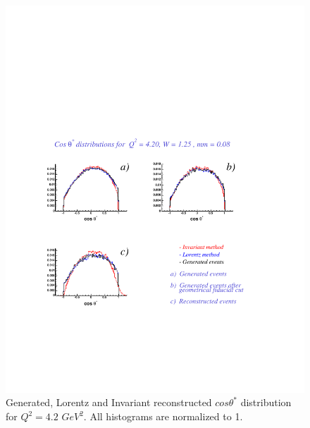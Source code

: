 \begin{figure}[h]
    \begin{center}
        \includegraphics[width = 12cm, bb = 60 140 540 540]{appendix/img/ctheta_q24.20_W1.25_mm0.08}
        \caption{Generated, Lorentz and Invariant reconstructed $cos\theta^*$ distribution for $Q^2=4.2$ $GeV^2$.
        All histograms are normalized to 1.}
    \end{center}
\end{figure}
